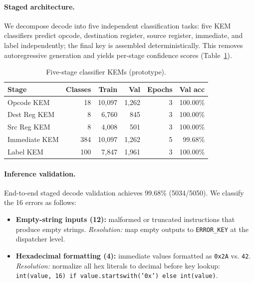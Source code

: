 \documentclass[11pt]{article}
\begin{document}
\paragraph{Staged architecture.}
We decompose decode into five independent classification tasks: five KEM classifiers predict opcode, destination register, source register, immediate, and label independently; the final key is assembled deterministically. This removes autoregressive generation and yields per-stage confidence scores (Table~\ref{tab:kem_specs}).

\begin{table}[h]
\centering
\caption{Five-stage classifier KEMs (prototype).}
\label{tab:kem_specs}
\begin{tabular}{lrrrrr}
\toprule
Stage & Classes & Train & Val & Epochs & Val acc \\
\midrule
Opcode KEM & 18 & 10{,}097 & 1{,}262 & 3 & 100.00\% \\
Dest Reg KEM & 8 & 6{,}760 & 845 & 3 & 100.00\% \\
Src Reg KEM & 8 & 4{,}008 & 501 & 3 & 100.00\% \\
Immediate KEM & 384 & 10{,}097 & 1{,}262 & 5 & 99.68\% \\
Label KEM & 100 & 7{,}847 & 1{,}961 & 3 & 100.00\% \\
\bottomrule
\end{tabular}
\end{table}

\paragraph{Inference validation.}
End-to-end staged decode validation achieves 99.68\% (5034/5050). We classify the 16 errors as follows:
\begin{itemize}[leftmargin=*]
  \item \textbf{Empty-string inputs (12):} malformed or truncated instructions that produce empty strings. \emph{Resolution:} map empty outputs to \texttt{ERROR\_KEY} at the dispatcher level.
  \item \textbf{Hexadecimal formatting (4):} immediate values formatted as \texttt{0x2A} vs. \texttt{42}. \emph{Resolution:} normalize all hex literals to decimal before key lookup: \texttt{int(value, 16) if value.startswith('0x') else int(value)}.
\end{itemize}
\end{document}
